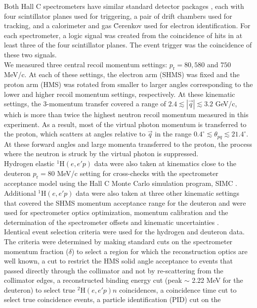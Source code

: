 \documentclass[aps,prl,twocolumn,showpacs,superscriptaddress,groupedaddress]{revtex4-2}  %
\begin{document}
\indent Both Hall C spectrometers have similar standard detector packages \cite{cyero_phdthesis}, each with four scintillator planes used for triggering, a pair of drift chambers used for tracking, and a calorimeter and gas \u{C}erenkov used for electron identification.
For each spectrometer, a logic signal was created from  the coincidence of hits in at least three of the four scintillator planes. The event trigger was the coincidence of these two signals. \\
\indent We measured three central recoil momentum settings: $p_{\mathrm{r}}=80, 580$ and $750$ MeV/c. At each of these settings, the electron arm (SHMS) was fixed and the proton arm (HMS) was rotated from smaller to larger angles corresponding to
the lower and higher recoil momentum settings, respectively. At these kinematic settings, the 3-momentum transfer covered a range of $2.4\lesssim|\vec{q}|\lesssim3.2$ GeV/c, which is more than twice the highest neutron recoil momentum
measured in this experiment. As a result, most of the virtual photon momentum is transferred to the proton, which scatters at angles relative to $\vec{q}$ in the range $0.4^{\circ}\lesssim \theta_{pq}\lesssim21.4^{\circ}$.
At these forward angles and large momenta transferred to the proton, the  process where the neutron is struck by the virtual photon is suppressed.\\
\indent Hydrogen elastic $^{1}\mathrm{H}(e,e'p)$ data were also taken at kinematics close to the deuteron $p_{\mathrm{r}}=80$ MeV/c setting for cross-checks with the spectrometer acceptance model using the Hall C Monte Carlo
simulation program, SIMC \cite{PhysRevC.64.054610}. Additional $^{1}\mathrm{H}(e,e'p)$ data were also taken at three other kinematic settings that covered the SHMS momentum acceptance range for the deuteron and were used for spectrometer optics optimization, 
momentum calibration and the determination of the spectrometer offsets and kinematic uncertainties \cite{cyero_phdthesis}.\\
\indent Identical event selection criteria were used for the hydrogen and deuteron data. The criteria were determined by making standard cuts on the spectrometer momentum fraction ($\delta$) to select a region for which the reconstruction optics
are well known,  a cut to restrict the HMS solid angle acceptance to events that passed directly through the collimator and not by re-scattering from the collimator edges, a reconstructed binding
energy cut (peak $\sim$ 2.22 MeV for the deuteron) to select true $^{2}\mathrm{H}(e,e'p)n$ coincidences, a coincidence time cut to select true coincidence events, a particle identification (PID) cut on the
\end{document}

